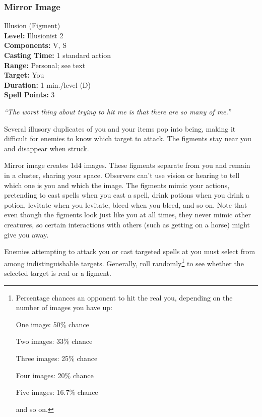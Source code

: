 \subsubsection{Mirror Image}
\label{Spell:MirrorImage}
Illusion (Figment)
\\ \textbf{Level:} Illusionist 2
\\ \textbf{Components:} V, S
\\ \textbf{Casting Time:} 1 standard action
\\ \textbf{Range:} Personal; see text
\\ \textbf{Target:} You
\\ \textbf{Duration:} 1 min./level (D)
\\ \textbf{Spell Points:} 3

\emph{``The worst thing about trying to hit me is that there are so many of me.''}

Several illusory duplicates of you and your items pop into being, making it difficult for enemies to know which target to attack. 
The figments stay near you and disappear when struck.

Mirror image creates 1d4 images. %
These figments separate from you and remain in a cluster, sharing your space. 
Observers can't use vision or hearing to tell which one is you and which the image.
The figments mimic your actions, pretending to cast spells when you cast a spell, drink potions when you drink a potion, levitate when you levitate, bleed when you bleed, and so on.
Note that even though the figments look just like you at all times, they never mimic other creatures, so certain interactions with others (such as getting on a horse) might give you away.

Enemies attempting to attack you or cast targeted spells at you must select from among indistinguishable targets. 
Generally, roll randomly\footnote{Percentage chances an opponent to hit the real you, depending on the number of images you have up:
\begin{list}{}{\leftmargin=1em}
 \item One image: 50\% chance
 \item Two images: 33\% chance
 \item Three images: 25\% chance
 \item Four images: 20\% chance
 \item Five images: 16.7\% chance
\end{list}
and so on.} to see whether the selected target is real or a figment.

